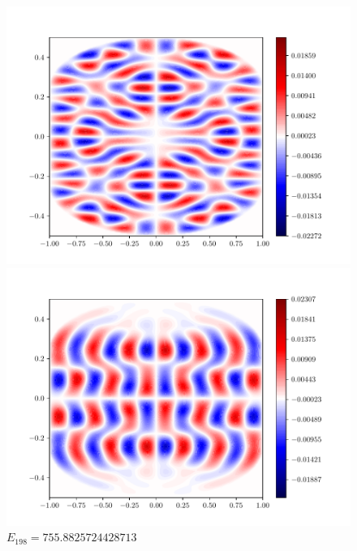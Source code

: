 \documentclass{article}
\begin{document}
\begin{enumerate}[1.]
\begin{enumerate}[(A)]
\begin{enumerate}[(i)]
\begin{figure}[H]
        \begin{minipage}{0.3\linewidth}
          \centering
          \includegraphics[width=\linewidth]{q6c-195.pdf}
          \caption*{$E_{195} = 735.5352784543273$}
        \end{minipage}
        \begin{minipage}{0.3\linewidth}
          \centering
          \includegraphics[width=\linewidth]{q6c-198.pdf}
          \caption*{$E_{198}= 755.8825724428713$}
        \end{minipage}
        \begin{minipage}{0.3\linewidth}
          \centering

\end{minipage}
\end{figure}
\end{enumerate}
\end{enumerate}
\end{enumerate}
\end{document}
